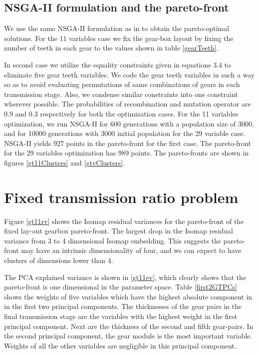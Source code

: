 \subsection{NSGA-II formulation and the pareto-front}
We use the same NSGA-II formulation as in \citep{debgt} to obtain the
pareto-optimal solutions. For the 11 variables case we fix the 
gear-box layout by fixing the number of teeth in each gear to the 
values shown in table \ref{gearTeeth}. 



In second case we utilize the equality constraints given in equations 3.4
to eliminate five gear teeth variables. We code the gear teeth variables in
such a way so as to avoid evaluating permutations of same combinations of
gears in each transmission stage. Also, we condense similar constraints
into one constraint wherever possible. The probabilities of recombination
and mutation operator are 0.9 and 0.3 respectively for both the
optimization cases. For the 11 variables optimization, we run NSGA-II for
600 generations with a population size of 3000, and for 10000 generations
with 3000 initial population for the 29 variable case. NSGA-II yields 927
points in the pareto-front for the first case. The pareto-front for the 29
variables optimization has 989 points. The pareto-fronts are shown in
figures \ref{gt11Clusters} and \ref{gtvClusters}.


\section{Fixed transmission ratio problem}

Figure \ref{gt11rv} shows the Isomap residual variances for the
pareto-front of the fixed lay-out gearbox pareto-front. The largest drop in
the Isomap residual variance from 3 to 4 dimensional Isomap embedding. This
suggests the pareto-front may have an intrinsic dimensionality of four, and
we can expect to have clusters of dimensions lower than 4.

The PCA explained variance is shown in \ref{gt11ev}, which clearly shows
that the pareto-front is one dimensional in the parameter space. Table
\ref{first2GTPCs} shows the weights of five variables which have the
highest absolute component in in the first two principal components. The
thicknesses of the gear pairs in the final transmission stage are the
variables with the highest weight in the first principal component. Next
are the thickness of the second and fifth gear-pairs. In the second
principal component, the gear module is the most important
variable. Weights of all the other variables are  negligible in this
principal component.


